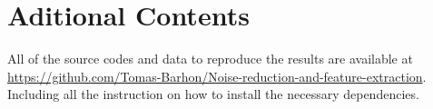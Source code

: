 \chapter{Aditional Contents}

All of the source codes and data to reproduce the results are 
available at 
\href{https://github.com/Tomas-Barhon/Noise-reduction-and-feature-extraction-with-principal-component-analysis}{https://github.com/Tomas-Barhon/Noise-reduction-and-feature-extraction}. 
Including all the instruction on how to install the necessary dependencies.

